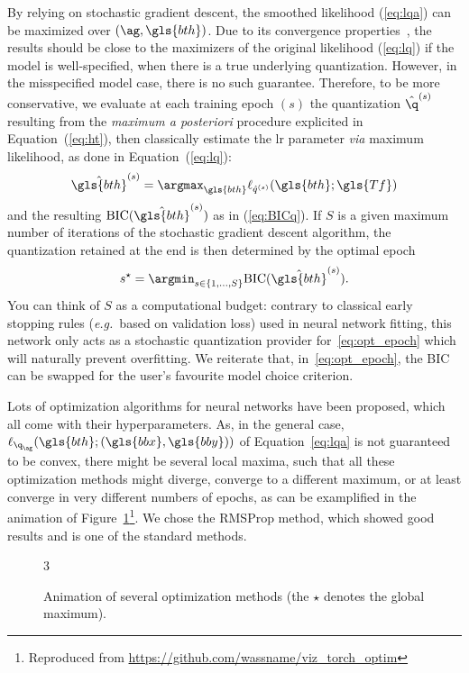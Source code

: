 By relying on stochastic gradient descent, the smoothed likelihood (\ref{eq:lqa}) can be maximized over $\left(\ag, \gls{bth} \right)$. Due to its convergence properties~\cite{bottou2010large}, the results should be close to the maximizers of the original likelihood (\ref{eq:lq}) if the model is well-specified, when there is a true underlying quantization. However, in the misspecified model case, there is no such guarantee. Therefore, to be more conservative, we evaluate at each training epoch $(s)$ the quantization $\hat{\q}^{(s)}$ resulting from the \textit{maximum a posteriori} procedure explicited in Equation~(\ref{eq:ht}), then classically estimate the \gls{lr} parameter \textit{via} maximum likelihood, as done in Equation~(\ref{eq:lq}):
\begin{equation} \label{eq:lr_param_q}
\hat{\gls{bth}}^{(s)} = \argmax_{\gls{bth}} \ell_{\hat{q}^{(s)}}(\gls{bth}; \gls{Tf})
\end{equation}
and the resulting $\mbox{BIC}(\hat{\gls{bth}}^{(s)})$ as in (\ref{eq:BICq}). If $S$ is a given maximum number of iterations of the stochastic gradient descent algorithm, the quantization retained at the end is then determined by the optimal epoch
\begin{equation} \label{eq:opt_epoch}
s^\star=\argmin_{s\in \{1,\ldots, S\}} \mbox{BIC}(\hat{\gls{bth}}^{(s)}).
\end{equation}
You can think of $S$ as a computational budget: contrary to classical early stopping rules (\textit{e.g.}\ based on validation loss) used in neural network fitting, this network only acts as a stochastic quantization provider for~\eqref{eq:opt_epoch} which will naturally prevent overfitting. We reiterate that, in~\eqref{eq:opt_epoch}, the BIC can be swapped for the user's favourite model choice criterion.

Lots of optimization algorithms for neural networks have been proposed, which all come with their hyperparameters. As, in the general case, $\ell_{\q_{\ag}}(\gls{bth} ; (\gls{bbx},\gls{bby}))$ of Equation~\eqref{eq:lqa} is not guaranteed to be convex, there might be several local maxima, such that all these optimization methods might diverge, converge to a different maximum, or at least converge in very different numbers of epochs, as can be examplified in the animation of Figure~\ref{fig:anim_sgd}{\footnote{Reproduced from \url{https://github.com/wassname/viz_torch_optim}}}. We chose the RMSProp method, which showed good results and is one of the standard methods.

\begin{figure}[!ht]
\begin{animateinline}[poster=first, controls=all, palindrome, autopause, autoresume, width=\textwidth]{3}
%
\end{animateinline}
\caption{\label{fig:anim_sgd} Animation of several optimization methods (the $\star$ denotes the global maximum).}
\end{figure}

